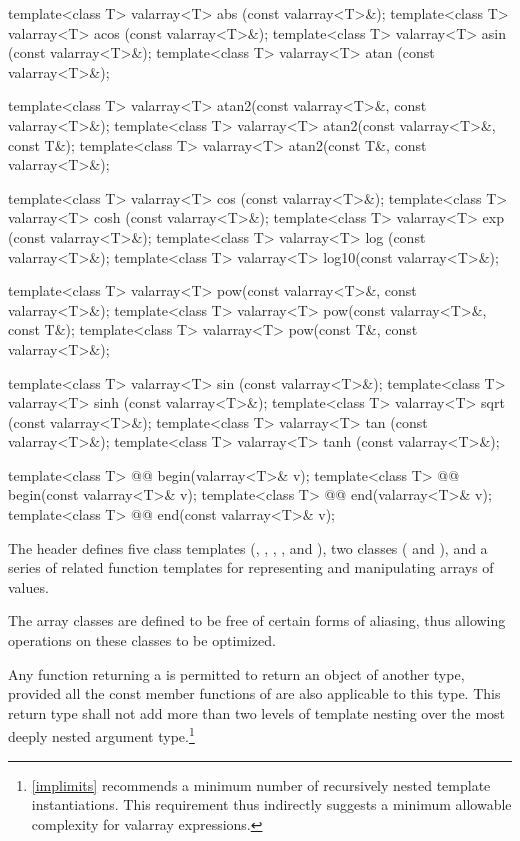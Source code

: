 \begin{codeblock}
{  template<class T> valarray<T> abs  (const valarray<T>&);
  template<class T> valarray<T> acos (const valarray<T>&);
  template<class T> valarray<T> asin (const valarray<T>&);
  template<class T> valarray<T> atan (const valarray<T>&);

  template<class T> valarray<T> atan2(const valarray<T>&, const valarray<T>&);
  template<class T> valarray<T> atan2(const valarray<T>&, const T&);
  template<class T> valarray<T> atan2(const T&, const valarray<T>&);

  template<class T> valarray<T> cos  (const valarray<T>&);
  template<class T> valarray<T> cosh (const valarray<T>&);
  template<class T> valarray<T> exp  (const valarray<T>&);
  template<class T> valarray<T> log  (const valarray<T>&);
  template<class T> valarray<T> log10(const valarray<T>&);

  template<class T> valarray<T> pow(const valarray<T>&, const valarray<T>&);
  template<class T> valarray<T> pow(const valarray<T>&, const T&);
  template<class T> valarray<T> pow(const T&, const valarray<T>&);

  template<class T> valarray<T> sin  (const valarray<T>&);
  template<class T> valarray<T> sinh (const valarray<T>&);
  template<class T> valarray<T> sqrt (const valarray<T>&);
  template<class T> valarray<T> tan  (const valarray<T>&);
  template<class T> valarray<T> tanh (const valarray<T>&);

  template<class T> @@ begin(valarray<T>& v);
  template<class T> @@ begin(const valarray<T>& v);
  template<class T> @@ end(valarray<T>& v);
  template<class T> @@ end(const valarray<T>& v);
}
\end{codeblock}

\pnum
The header
defines five
class templates
(,
,
,
,
and
),
two classes (
and
),
and a series of related
function templates
for representing
and manipulating arrays of values.

\pnum
The
array classes
are defined to be free of certain forms of aliasing, thus allowing
operations on these classes to be optimized.

\pnum
Any function returning a
is permitted to return an object of another type, provided all the
const member functions of
are also applicable to this type.
This return type shall not add
more than two levels of template nesting over the most deeply nested
argument type.\footnote{\ref{implimits} recommends a minimum number
of recursively nested template
instantiations.
This requirement thus indirectly suggests a minimum
allowable complexity for valarray expressions.}

